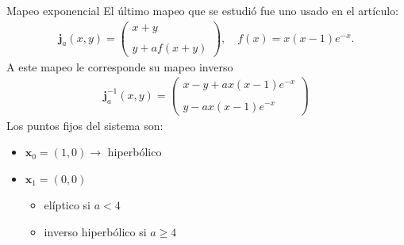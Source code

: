 \documentclass[11pt]{beamer}
\theoremstyle{definition}
\begin{document}
\begin{frame}{Mapeo exponencial}
El último mapeo que se estudió fue uno usado en el artículo: 
\begin{eqnarray}
\mathbf{j}_{a}(x,y)=\left(\begin{array}{lcc}
x+y\\
\\ y+af(x+y)
\end{array}\right), \quad f(x)=x(x-1)e^{-x}.
\label{Jung}
\end{eqnarray}
A este mapeo le corresponde su mapeo inverso
\begin{eqnarray}
\mathbf{j}^{-1}_{a}(x,y)=\left(\begin{array}{lcc}
x-y+ax(x-1)e^{-x}\\
\\ y-ax(x-1)e^{-x}
\end{array}\right)
\label{jungI}
\end{eqnarray}
Los puntos fijos del sistema son:
\begin{itemize}
	\item $\mathbf{x}_{0}=(1,0) \rightarrow$ hiperb\'olico
	\item $\mathbf{x}_{1}=(0,0)$  
	\begin{itemize}
		\item el\'iptico si $a<4$
		\item inverso hiperb\'olico si $a \geq 4$
	\end{itemize}
\end{itemize}

\end{frame}
\end{document}
